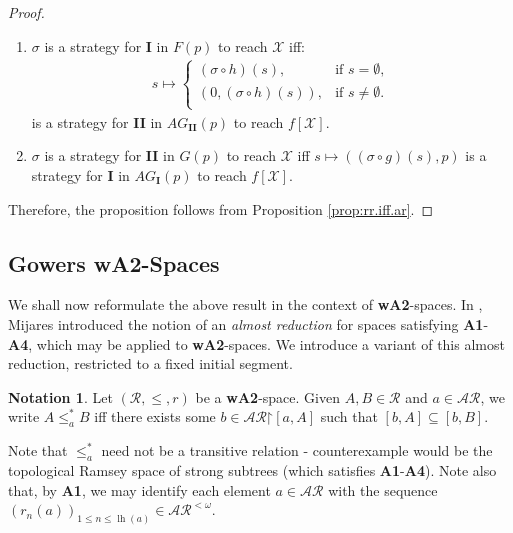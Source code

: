 \documentclass[11pt,reqno]{amsart}
\theoremstyle{plain}
\numberwithin{equation}{section}
\theoremstyle{definition}
\newtheorem{notation}[theorem]{Notation}
\newcommand{\func}{\operatorname}
\newcommand{\cal}{\mathcal}
\newcommand{\restrictedto}{\mathord{\upharpoonright}}
\newcommand{\X}{\cal{X}}
\newcommand{\lh}{\func{lh}}
\begin{document}
\begin{proof}
\begin{enumerate}
        \item $\sigma$ is a strategy for \textbf{I} in $F(p)$ to reach $\X$ iff:
        \begin{align*}
            s \mapsto 
            \begin{cases}
                (\sigma \circ h)(s), &\text{if $s = \emptyset$}, \\
                (0,(\sigma \circ h)(s)), &\text{if $s \neq \emptyset$}. \\
            \end{cases}
        \end{align*}
        is a strategy for \textbf{II} in $AG_\textbf{II}(p)$ to reach $f[\X]$.

        \item $\sigma$ is a strategy for \textbf{II} in $G(p)$ to reach $\X$ iff $s \mapsto ((\sigma \circ g)(s),p)$ is a strategy for \textbf{I} in $AG_\textbf{I}(p)$ to reach $f[\X]$.
    \end{enumerate}
    Therefore, the proposition follows from Proposition \ref{prop:rr.iff.ar}.
\end{proof}

\subsection{Gowers \textbf{wA2}-Spaces}
We shall now reformulate the above result in the context of \textbf{wA2}-spaces. In \cite{M07}, Mijares introduced the notion of an \emph{almost reduction} for spaces satisfying \textbf{A1}-\textbf{A4}, which may be applied to \textbf{wA2}-spaces. We introduce a variant of this almost reduction, restricted to a fixed initial segment.

\begin{notation}
    Let $(\cal{R},\leq,r)$ be a \textbf{wA2}-space. Given $A,B \in \cal{R}$ and $a \in \cal{AR}$, we write $A \leq_a^* B$ iff there exists some $b \in \cal{AR}\restrictedto[a,A]$ such that $[b,A] \subseteq [b,B]$.
\end{notation}

Note that $\leq_a^*$ need not be a transitive relation - counterexample would be the topological Ramsey space of strong subtrees (which satisfies \textbf{A1}-\textbf{A4}). Note also that, by \textbf{A1}, we may identify each element $a \in \cal{AR}$ with the sequence $(r_n(a))_{1 \leq n \leq \lh(a)} \in \cal{AR}^{<\omega}$.
\end{document}
